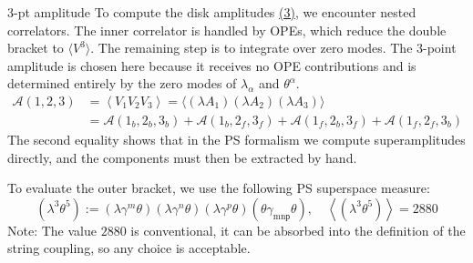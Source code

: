 \documentclass{beamer}
\begin{document}
\begin{frame}[allowframebreaks]{3-pt amplitude}\label{3-pt}
	To compute the disk amplitudes \hyperlink{disk}{\color{blue}(3)}, we encounter nested correlators. The inner correlator is handled by OPEs, which reduce the double bracket to $\langle V^3\rangle$. The remaining step is to integrate over zero modes. The 3-point amplitude is chosen here because it receives no OPE contributions and is determined entirely by the zero modes of $\lambda_\alpha$ and $\theta^\alpha$.
	\begin{equation*}
		\begin{aligned}\mathcal{A}(1,2,3)&=\left\langle V_1 V_2 V_3\right\rangle=\langle(\lambda A_1)(\lambda A_2)(\lambda A_3)\rangle\\&=\mathcal{A}(1_b,2_b,3_b)+\mathcal{A}(1_b,2_f,3_f)+\mathcal{A}(1_f,2_b,3_f)+\mathcal{A}(1_f,2_f,3_b)
		\end{aligned}
	\end{equation*}
	The second equality shows that in the PS formalism we compute superamplitudes directly, and the components must then be extracted by hand.
	
	To evaluate the outer bracket, we use the following PS superspace measure:
	\begin{equation}
		(\lambda^3\theta^5):=(\lambda\gamma^m\theta)(\lambda\gamma^n\theta)(\lambda\gamma^p\theta)(\theta\gamma_\mathrm{mnр}\theta),\quad \left\langle(\lambda^3\theta^5)\right\rangle = 2880
	\end{equation}
	{\color{WHU} Note: }{The value $2880$ is conventional, it can be absorbed into the definition of the string coupling, so any choice is acceptable.}
	

\end{frame}
\end{document}
